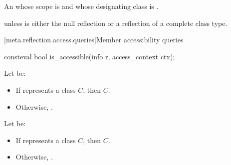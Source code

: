 \begin{itemdescr}
\pnum
\returns
An  whose scope is 
and whose designating class is .

\pnum
\throws
{} unless
 is either the null reflection
or a reflection of a complete class type.
\end{itemdescr}

[meta.reflection.access.queries]{Member accessibility queries}

%
\begin{itemdecl}
consteval bool is_accessible(info r, access_context ctx);
\end{itemdecl}

\begin{itemdescr}
\pnum
Let  be:
\begin{itemize}
\item If  represents a class $C$, then $C$.
\item Otherwise, .
\end{itemize}

\pnum
Let  be:
\begin{itemize}
\item If  represents a class $C$, then $C$.
\item Otherwise, .
\end{itemize}


\end{itemdescr}
